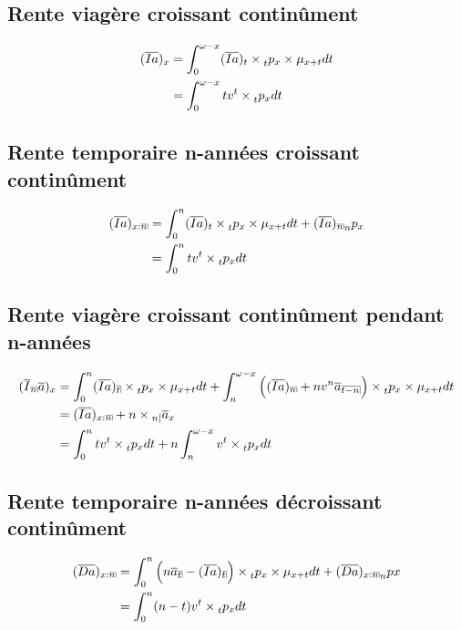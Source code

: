 \documentclass[11pt,french]{report}
\makeatletter
\DeclareRobustCommand{\annuity}[1]{%
\def\arraystretch{0}%
\setlength\arraycolsep{.7pt}%
\setlength\arrayrulewidth{.3pt}%
\begin{array}[b]{@{}c|}\hline
\\[\arraycolsep]%
\scriptstyle #1%
\end{array}%
}
\newcommand{\indiceGauche}[2]{{\vphantom{#2}}_{#1}#2}
\makeatother
\begin{document}
\subsection{Rente viagère croissant continûment}
\begin{align*}
(\overline{Ia})_x &= \int_{0}^{\omega - x}(\overline{Ia})_t \times \indiceGauche{t}{p}_x \times \mu_{x+t}dt \\
&=  \int_{0}^{\omega - x} t v^t \times \indiceGauche{t}{p}_x dt \\
\end{align*}

\subsection{Rente temporaire n-années croissant continûment}
\begin{align*}
(\overline{Ia})_{x:\annuity{n}} &= \int_{0}^{n}(\overline{Ia})_t \times \indiceGauche{t}{p}_x \times \mu_{x+t}dt + (\overline{Ia})_{\annuity{n}} \indiceGauche{n}{p}_x\\
&=  \int_{0}^{n} t v^t \times \indiceGauche{t}{p}_x dt \\
\end{align*}

\subsection{Rente viagère croissant continûment pendant n-années}
\begin{align*}
(\overline{I}_{\annuity{n}}\overline{a})_{x} &= \int_{0}^{n}(\overline{Ia})_{\annuity{t}} \times \indiceGauche{t}{p}_x \times \mu_{x+t}dt + \int_{n}^{\omega - x}\Big( (\overline{Ia})_{\annuity{n}} + nv^n \overline{a}_{\annuity{t-n}} \Big)\times \indiceGauche{t}{p}_x \times \mu_{x+t}dt \\
&= (\overline{Ia})_{x:\annuity{n}} + n \times \indiceGauche{n|}{\overline{a}}_x \\
&=  \int_{0}^{n} t v^t \times \indiceGauche{t}{p}_x dt + n \int_{n}^{\omega - x}v^t \times \indiceGauche{t}{p}_x dt\\
\end{align*}

\subsection{Rente temporaire n-années décroissant continûment}
\begin{align*}
(\overline{Da})_{x:\annuity{n}} &= \int_{0}^{n}\Big( n \overline{a}_{\annuity{t}} - (\overline{Ia})_{\annuity{t}} \Big) \times \indiceGauche{t}{p}_x \times \mu_{x+t}dt + (\overline{Da})_{x:\annuity{n}} \indiceGauche{n}{p}x \\
&=  \int_{0}^{n} (n-t) v^t \times \indiceGauche{t}{p}_x dt\\
\end{align*}
\end{document}
